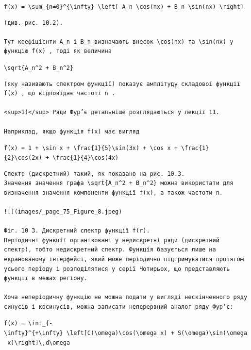 \documentclass[
  ukrainian,
]{article}
\begin{document}
\texttt{f(x)\ =\ \textbackslash{}sum\_\{n=0\}\^{}\{\textbackslash{}infty\}\ \textbackslash{}left{[}\ A\_n\ \textbackslash{}cos(nx)\ +\ B\_n\ \textbackslash{}sin(nx)\ \textbackslash{}right{]}}

\begin{verbatim}
(див. рис. 10.2).  

Тут коефіцієнти A_n і B_n визначають внесок \cos(nx) та \sin(nx) у функцію f(x) , тоді як величина
\end{verbatim}

\texttt{\textbackslash{}sqrt\{A\_n\^{}2\ +\ B\_n\^{}2\}}

\begin{verbatim}
(яку називають спектром функції) показує амплітуду складової функції f(x) , що відповідає частоті n .  

<sup>1)</sup> Ряди Фур’є детальніше розглядаються у лекції 11.  

Наприклад, якщо функція f(x) має вигляд
\end{verbatim}

\texttt{f(x)\ =\ 1\ +\ \textbackslash{}sin\ x\ +\ \textbackslash{}frac\{1\}\{5\}\textbackslash{}sin(3x)\ +\ \textbackslash{}cos\ x\ +\ \textbackslash{}frac\{1\}\{2\}\textbackslash{}cos(2x)\ +\ \textbackslash{}frac\{1\}\{4\}\textbackslash{}cos(4x)}

\begin{verbatim}
Спектр (дискретний) такий, як показано на рис. 10.3.
Значення значення графа \sqrt{A_n^2 + B_n^2} можна використати для визначення значення компоненти функції f(x), а також частоти n.

![](images/_page_75_Figure_8.jpeg)

Фіг. 10 3. Дискретний спектр функції f(r).
Періодичні функції організовані у недискретні ряди (дискретний спектр), тобто недискретний спектр. Функція базується лише на екранованому інтерфейсі, який може періодично підтримуватися протягом усього періоду і розподілятися у серії Чотирьох, що представляють функції в межах регіону.

Хоча неперіодичну функцію не можна подати у вигляді нескінченного ряду синусів і косинусів, можна записати неперервний аналог ряду Фур’є:
\end{verbatim}

\texttt{f(x)\ =\ \textbackslash{}int\_\{-\textbackslash{}infty\}\^{}\{+\textbackslash{}infty\}\ \textbackslash{}left{[}C(\textbackslash{}omega)\textbackslash{}cos(\textbackslash{}omega\ x)\ +\ S(\textbackslash{}omega)\textbackslash{}sin(\textbackslash{}omega\ x)\textbackslash{}right{]}\textbackslash{},d\textbackslash{}omega}
\end{document}
